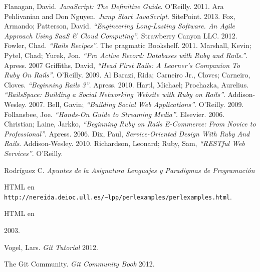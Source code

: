 \documentclass[11pt,a4paper]{article}
\begin{document}
\begin{thebibliography}{99}
 Flanagan, David. \emph{JavaScript: The Definitive Guide}. O'Reilly. 2011.
 Ara Pehlivanian and Don Nguyen. \emph{Jump Start JavaScript}. SitePoint. 2013.
 Fox, Armando; Patterson, David. \emph{“Engineering Long-Lasting Software. An Agile Approach Using SaaS \& Cloud Computing”}. Strawberry Canyon LLC. 2012.
 Fowler, Chad. \emph{“Rails Recipes”}. The pragmatic Bookshelf. 2011.
 Marshall, Kevin; Pytel, Chad; Yurek, Jon. \emph{“Pro Active Record: Databases with Ruby and Rails.”}. Apress. 2007
 Griffiths, David, \emph{“Head First Rails: A Learner's Companion To Ruby On Rails”}. O’Reilly. 2009.
 Al Barazi, Rida; Carneiro Jr., Cloves; Carneiro, Cloves. \emph{“Beginning Rails 3”}. Apress. 2010.
 Hartl, Michael; Prochazka, Aurelius. \emph{“RailsSpace: Building a Social Networking Website with Ruby on Rails”}.  Addison-Wesley. 2007.
 Bell, Gavin; \emph{“Building Social Web Applications”}. O’Reilly. 2009.
 Follansbee, Joe. \emph{“Hands-On Guide to Streaming Media”}. Elsevier. 2006.
 Christian; Laine, Jarkko, \emph{“Beginning Ruby on Rails E-Commerce: From Novice to Professional”}. Apress. 2006.
 Dix, Paul, \emph{Service-Oriented Design With Ruby And Rails}. Addison-Wesley. 2010.
 Richardson, Leonard; Ruby, Sam, \emph{“RESTful Web Services”}. O’Reilly. 

 Rodríguez C.  \emph{Apuntes de la Asignatura Lenguajes y Paradigmas de Programación }\\ 
    \begin{latexonly}
    HTML en \verb|http://nereida.deioc.ull.es/~lpp/perlexamples/perlexamples.html|.\\
    \end{latexonly}
    \begin{htmlonly}
    HTML en \\
    \end{htmlonly}
    2003.

 Vogel, Lars.  \emph{Git Tutorial}
    2012.

 The Git Community.  \emph{Git Community Book}
    2012.


\end{thebibliography}
\end{document}
